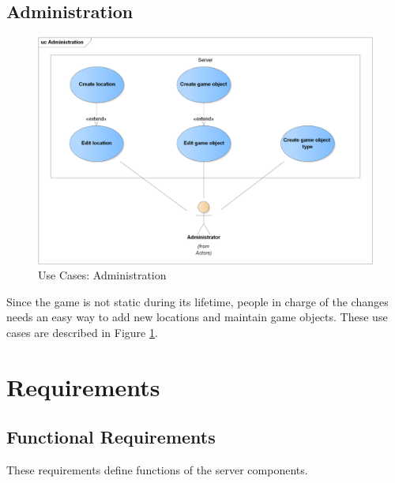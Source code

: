 	\subsection{Administration}
	\begin{figure}[h]	
		\includegraphics[width=\textwidth]{figures/UC_Administration}
		\centering			
		\caption{Use Cases: Administration}
		\label{fig:ucadmin}				
	\end{figure}	
	\noindent Since the game is not static during its lifetime, people in charge of the changes needs an easy way to add new locations and maintain game objects. These use cases are described in Figure \ref{fig:ucadmin}.
	
	
\section{Requirements}

	\subsection{Functional Requirements}
	These requirements define functions of the server components.
